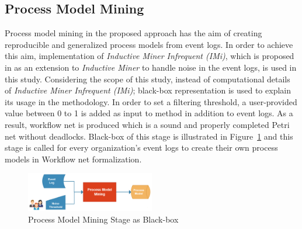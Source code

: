 \subsection{Process Model Mining}
\label{subsec:process-model-mining}
Process model mining in the proposed approach has the aim of creating reproducible and generalized process models from event logs. In order to achieve this aim, implementation of \textit{Inductive Miner Infrequent (IMi)}, which is proposed in \cite{leemans2014discoveringinfrequent} as an extension to \textit{Inductive Miner} to handle noise in the event logs, is used in this study. Considering the scope of this study, instead of computational details of \textit{Inductive Miner Infrequent (IMi)}; black-box representation is used to explain its usage in the methodology. In order to set a filtering threshold, a user-provided value between 0 to 1 is added as input to method in addition to event logs. As a result, workflow net is produced which is a sound and properly completed Petri net without deadlocks. Black-box of this stage is illustrated in Figure~\ref{fig:process-model-mining-blackbox} and this stage is called for every organization's event logs to create their own process models in Workflow net formalization.

\begin{figure}
  \centering
  \includegraphics[width=0.5\textwidth]{4_methodology/process-model-mining-blackbox}
  \caption{Process Model Mining Stage as Black-box }
  \label{fig:process-model-mining-blackbox}
\end{figure}

